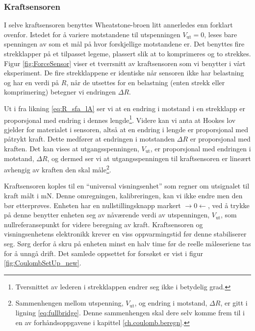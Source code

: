 \documentclass[../Elmag-labhefte-2020.tex]{subfiles}
\begin{document}
\subsubsection{Kraftsensoren} \vspace{-5mm}
I selve kraftsensoren benyttes Wheatstone-broen litt annerledes enn forklart ovenfor. Istedet for å variere motstandene til utspenningen $V_\text{ut} = 0$, leses bare spenningen av som et mål på hvor forskjellige motstandene er. Det benyttes fire strekklapper på et tilpasset legeme, plassert slik at to komprimeres og to strekkes. Figur \ref{fig:ForceSensor} viser et tverrsnitt av kraftsensoren som vi benytter i vårt eksperiment. De fire strekklappene er identiske når sensoren ikke har belastning og har en verdi på $R$, når de utsettes for en belastning (enten strekk eller komprimering) betegner vi endringen ${\Delta R}$. 

Ut i fra likning \eqref{eq:R_sfa_lA} ser vi at en endring i motstand i en strekklapp er proporsjonal med endring i dennes lengde\footnote{Tversnittet av lederen i strekklappen endrer seg ikke i betydelig grad.}. Videre kan vi anta at Hookes lov gjelder for materialet i sensoren, altså at en endring i lengde er proporsjonal med påtrykt kraft. Dette medfører at endringen i motstanden $\Delta R$ er proporsjonal med kraften. Det kan vises at utgangsspenningen, $V_\text{ut}$, er proporsjonal med endringen i motstand, $\Delta R$, og dermed ser vi at utgangsspenningen til kraftsensoren er lineært avhengig av kraften den skal måle\footnote{Sammenhengen mellom utspenning, $V_\text{ut}$,  og endring i motstand, $\Delta R$, er gitt i ligning \eqref{eq:fullbridge}. Denne sammenhengen skal dere selv komme frem til i en av forhåndsoppgavene i kapittel \ref{ch.coulomb.beregn}.}. 

Kraftsensoren koples til en ``universal visningsenhet'' som regner om utsignalet til kraft målt i \si{\milli\newton}.  Denne omregningen, kalibreringen, kan vi ikke endre men den bør etterprøves. Enheten har en nullstillingsknapp markert $\rightarrow 0 \leftarrow$, ved å trykke på denne benytter enheten seg av nåværende verdi av utspenningen, $V_\text{ut}$, som nullreferansepunkt for videre beregning av kraft. Kraftsensoren og visningsenhetens elektronikk krever en viss oppvarmingstid før denne stabiliserer seg. Sørg derfor å skru på enheten minst en halv time før de reelle måleseriene tas for å unngå drift. Det samlede oppsettet for forsøket er vist i figur \ref{fig:CoulombSetUp_new}.
\end{document}
